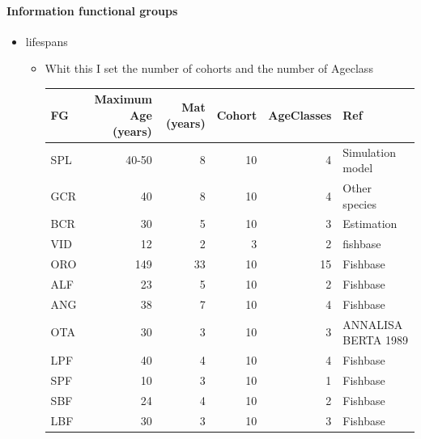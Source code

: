 \documentclass[11pt]{article}
\begin{document}
\paragraph*{Information functional groups}
\label{sec-5-1-2-3}
\begin{itemize}

\item lifespans
\label{sec-5-1-2-3-1}%
\begin{itemize}
\item Whit this I set the number of cohorts and the number of Ageclass

\begin{center}
\begin{tabular}{lrrrrl}
 FG   &  Maximum Age (years)  &  Mat (years)  &  Cohort  &  AgeClasses  &  Ref                  \\
\hline
 SPL  &                40-50  &            8  &      10  &           4  &  Simulation model     \\
 GCR  &                   40  &            8  &      10  &           4  &  Other species        \\
 BCR  &                   30  &            5  &      10  &           3  &  Estimation           \\
 VID  &                   12  &            2  &       3  &           2  &  fishbase             \\
 ORO  &                  149  &           33  &      10  &          15  &  Fishbase             \\
 ALF  &                   23  &            5  &      10  &           2  &  Fishbase             \\
 ANG  &                   38  &            7  &      10  &           4  &  Fishbase             \\
 OTA  &                   30  &            3  &      10  &           3  &  ANNALISA BERTA 1989  \\
 LPF  &                   40  &            4  &      10  &           4  &  Fishbase             \\
 SPF  &                   10  &            3  &      10  &           1  &  Fishbase             \\
 SBF  &                   24  &            4  &      10  &           2  &  Fishbase             \\
 LBF  &                   30  &            3  &      10  &           3  &  Fishbase             \\
\end{tabular}
\end{center}



\end{itemize}
\end{itemize}
\end{document}
